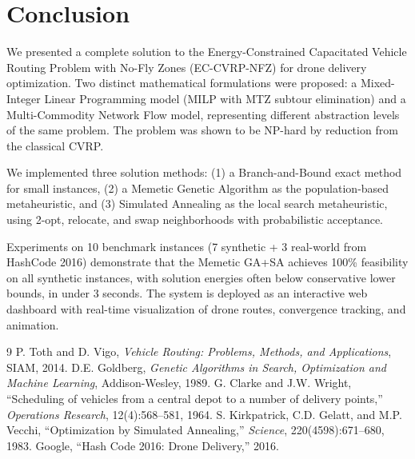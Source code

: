 \documentclass[12pt,a4paper]{article}
\begin{document}
\section{Conclusion}
We presented a complete solution to the Energy-Constrained Capacitated Vehicle Routing Problem with No-Fly Zones (EC-CVRP-NFZ) for drone delivery optimization. Two distinct mathematical formulations were proposed: a Mixed-Integer Linear Programming model (MILP with MTZ subtour elimination) and a Multi-Commodity Network Flow model, representing different abstraction levels of the same problem. The problem was shown to be NP-hard by reduction from the classical CVRP.

We implemented three solution methods: (1) a Branch-and-Bound exact method for small instances, (2) a Memetic Genetic Algorithm as the population-based metaheuristic, and (3) Simulated Annealing as the local search metaheuristic, using 2-opt, relocate, and swap neighborhoods with probabilistic acceptance.

Experiments on 10 benchmark instances (7 synthetic + 3 real-world from HashCode 2016) demonstrate that the Memetic GA+SA achieves 100\% feasibility on all synthetic instances, with solution energies often below conservative lower bounds, in under 3 seconds. The system is deployed as an interactive web dashboard with real-time visualization of drone routes, convergence tracking, and animation.

\begin{thebibliography}{9}
 P. Toth and D. Vigo, \textit{Vehicle Routing: Problems, Methods, and Applications}, SIAM, 2014.
 D.E. Goldberg, \textit{Genetic Algorithms in Search, Optimization and Machine Learning}, Addison-Wesley, 1989.
 G. Clarke and J.W. Wright, ``Scheduling of vehicles from a central depot to a number of delivery points,'' \textit{Operations Research}, 12(4):568--581, 1964.
 S. Kirkpatrick, C.D. Gelatt, and M.P. Vecchi, ``Optimization by Simulated Annealing,'' \textit{Science}, 220(4598):671--680, 1983.
 Google, ``Hash Code 2016: Drone Delivery,'' 2016.
\end{thebibliography}
\end{document}
